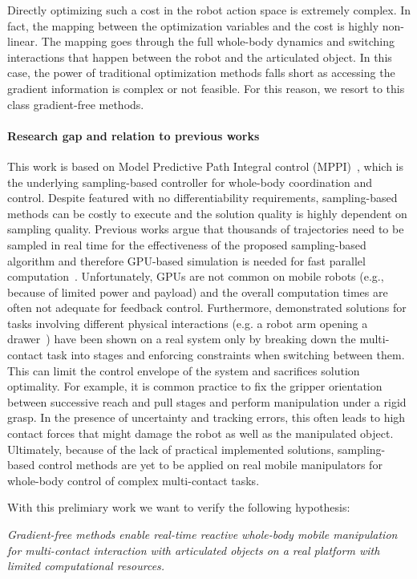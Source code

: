 Directly optimizing such a cost in the robot action space is extremely complex. In fact, the mapping between the optimization variables and the cost is highly non-linear. The mapping goes through the full whole-body dynamics and switching interactions that happen between the robot and the articulated object. In this case, the power of traditional optimization methods falls short as accessing the gradient information is complex or not feasible. For this reason, we resort to this class gradient-free methods. 

\paragraph{Research gap and relation to previous works}  This work is based on Model Predictive Path Integral control (MPPI)~\cite{williams_information_2017}, which is the underlying sampling-based controller for whole-body coordination and control. Despite featured with no differentiability requirements, sampling-based methods can be costly to execute and the solution quality is highly dependent on sampling quality. Previous works argue that thousands of trajectories need to be sampled in real time for the effectiveness of the proposed sampling-based algorithm and therefore GPU-based simulation is needed for fast parallel computation~\cite{williams_model_2017}. Unfortunately, GPUs are not common on mobile robots (e.g., because of limited power and payload) and the overall computation times are often not adequate for feedback control. 
Furthermore, demonstrated solutions for tasks involving different physical interactions (e.g. a robot arm opening a drawer~\cite{abraham_model-based_2020}) have been shown on a real system only by breaking down the multi-contact task into stages and enforcing constraints when switching between them. 
This can limit the control envelope of the system and sacrifices solution optimality. For example, it is common practice to fix the gripper orientation between successive reach and pull stages and perform manipulation under a rigid grasp. In the presence of uncertainty and tracking errors, this often leads to high contact forces that might damage the robot as well as the manipulated object.
Ultimately, because of the lack of practical implemented solutions, sampling-based control methods are yet to be applied on real mobile manipulators for whole-body control of complex multi-contact tasks.   

With this prelimiary work we want to verify the following hypothesis:
\begin{displayquote}
\textit{Gradient-free methods enable real-time reactive whole-body mobile manipulation for multi-contact interaction with articulated objects on a real platform with limited computational resources.}
\end{displayquote}

